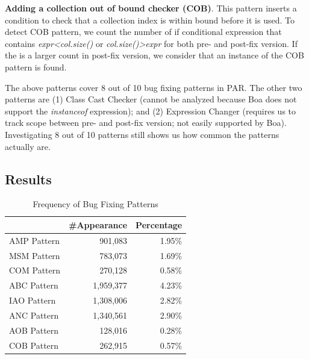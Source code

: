 \documentclass{sig-alternate-05-2015}
\begin{document}
\vspace{1ex}
\noindent
 {\bf Adding a collection out of bound checker (COB)}.  This pattern inserts a condition to check that a
    collection index is within bound before it is used.
To detect COB pattern, we count the number of if conditional expression that
contains {\em expr<col.size()} or {\em col.size()>expr} for both pre- and
post-fix version. If the is a larger count in post-fix
version, we consider that an instance of the COB pattern is found.

\vspace{1ex} The above patterns cover 8 out of 10 bug fixing patterns in
PAR. The other two patterns are (1) Class Cast Checker (cannot be analyzed because
Boa does not support the {\em instanceof} expression); and (2) Expression Changer (requires us to track scope between pre- and post-fix version; not
easily supported by Boa). Investigating 8 out of
10 patterns still shows us how common the patterns actually are.

\subsection{Results} \label{sec:freqfixpattern}

\begin{table}[!htb]
	\centering
	\begin{tabular}{lrr} 
		\hline
		& \textbf{\#Appearance} & \textbf{Percentage}\\
		\hline
		AMP Pattern & 901,083 & 1.95\%\\
		MSM Pattern & 783,073 & 1.69\%\\
		COM Pattern & 270,128 & 0.58\%\\ 
		ABC Pattern & 1,959,377 & 4.23\%\\  
		IAO Pattern & 1,308,006 & 2.82\%\\  
		ANC Pattern & 1,340,561 & 2.90\%\\  
		AOB Pattern & 128,016 & 0.28\%\\  
		COB Pattern & 262,915 & 0.57\%\\   
		\hline
	\end{tabular}
	\caption{Frequency of Bug Fixing Patterns}\label{tab:freqpattern}
	
\end{table}
\end{document}
